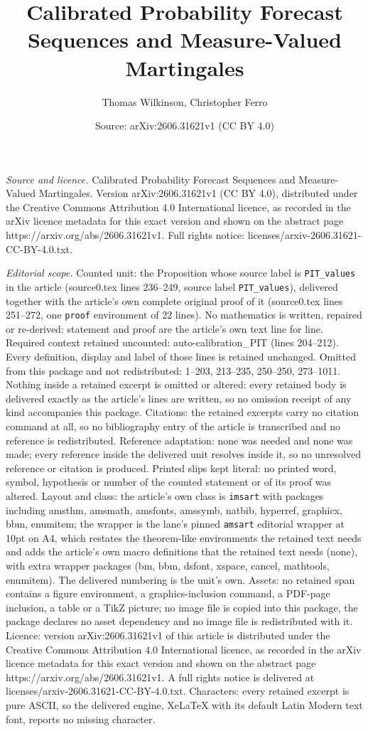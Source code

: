 \documentclass[10pt,a4paper]{amsart}
\title[Calibrated Probability Forecast Sequences and Measure-Valued]{Calibrated Probability Forecast Sequences and Measure-Valued Martingales}
\author{Thomas Wilkinson, Christopher Ferro}
\date{Source: arXiv:2606.31621v1 (CC BY 4.0)}
\begin{document}
\maketitle

\noindent\emph{Source and licence.} Calibrated Probability Forecast Sequences and Measure-Valued Martingales. Version arXiv:2606.31621v1 (CC BY 4.0), distributed under the Creative Commons Attribution 4.0 International licence, as recorded in the arXiv licence metadata for this exact version and shown on the abstract page https://arxiv.org/abs/2606.31621v1. Full rights notice: licenses/arxiv-2606.31621-CC-BY-4.0.txt.\par\smallskip

\noindent\textit{Editorial scope.} Counted unit: the Proposition whose source label is \texttt{PIT\_values} in the article (source0.tex lines 236--249, source label \texttt{PIT\_values}), delivered together with the article's own complete original proof of it (source0.tex lines 251--272, one \texttt{proof} environment of 22 lines). No mathematics is written, repaired or re-derived: statement and proof are the article's own text line for line. Required context retained uncounted: auto-calibration\_PIT (lines 204--212). Every definition, display and label of those lines is retained unchanged. Omitted from this package and not redistributed: 1--203, 213--235, 250--250, 273--1011. Nothing inside a retained excerpt is omitted or altered: every retained body is delivered exactly as the article's lines are written, so no omission receipt of any kind accompanies this package. Citations: the retained excerpts carry no citation command at all, so no bibliography entry of the article is transcribed and no reference is redistributed. Reference adaptation: none was needed and none was made; every reference inside the delivered unit resolves inside it, so no unresolved reference or citation is produced. Printed slips kept literal: no printed word, symbol, hypothesis or number of the counted statement or of its proof was altered. Layout and class: the article's own class is \texttt{imsart} with packages including amsthm, amsmath, amsfonts, amssymb, natbib, hyperref, graphicx, bbm, enumitem; the wrapper is the lane's pinned \texttt{amsart} editorial wrapper at 10pt on A4, which restates the theorem-like environments the retained text needs and adds the article's own macro definitions that the retained text needs (none), with extra wrapper packages (bm, bbm, dsfont, xspace, cancel, mathtools, enumitem). The delivered numbering is the unit's own. Assets: no retained span contains a figure environment, a graphics-inclusion command, a PDF-page inclusion, a table or a TikZ picture; no image file is copied into this package, the package declares no asset dependency and no image file is redistributed with it. Licence: version arXiv:2606.31621v1 of this article is distributed under the Creative Commons Attribution 4.0 International licence, as recorded in the arXiv licence metadata for this exact version and shown on the abstract page https://arxiv.org/abs/2606.31621v1. A full rights notice is delivered at licenses/arxiv-2606.31621-CC-BY-4.0.txt. Characters: every retained excerpt is pure ASCII, so the delivered engine, XeLaTeX with its default Latin Modern text font, reports no missing character.
\end{document}
